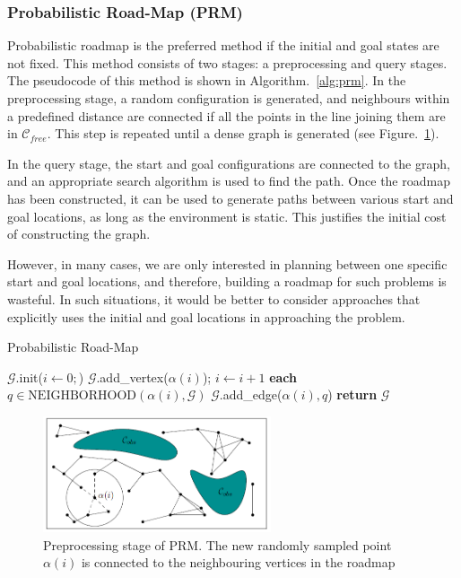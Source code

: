 \subsubsection{Probabilistic Road-Map (PRM)}
Probabilistic roadmap is the preferred method if the initial and goal states are not fixed. This method consists of two stages: a preprocessing and query stages. The pseudocode of this method is shown in Algorithm.~\ref{alg:prm}.
In the preprocessing stage, a random configuration is generated, and neighbours within a predefined distance are connected if all the points in the line joining them are in $\mathcal{C}_{free}$. This step is repeated until a dense graph is generated (see Figure.~\ref{fig:prm}). 

In the query stage, the start and goal configurations are connected to the graph, and an appropriate search algorithm is used to find the path. Once the roadmap has been constructed, it can be used to generate paths between various start and goal locations, as long as the environment is static. This justifies the initial cost of constructing the graph. 

However, in many cases, we are only interested in planning between one specific start and goal locations, and therefore, building a roadmap for such problems is wasteful. In such situations, it would be better to consider approaches that explicitly uses the initial and goal locations in approaching the problem.


\begin{algorithm}
\caption{Probabilistic Road-Map}\label{alg:prm}
\begin{algorithmic}[1]
\State $\mathcal{G}$.init($i\gets 0;$)
\State $\mathcal{G}$.add\_vertex($\alpha(i)$); $i\gets i+1$
\For \textbf{each} $q\in \text{NEIGHBORHOOD}(\alpha(i),\mathcal{G})$
\State $\mathcal{G}$.add\_edge($\alpha(i),q$)
\EndIf
\EndFor
\EndIf
\EndWhile
\State \textbf{return} $\mathcal{G}$
\end{algorithmic}
\end{algorithm}

\begin{figure}
\centering
\includegraphics[width=0.6\textwidth]{./images/prm}
\caption[Preprocessing stage of PRM]{Preprocessing stage of PRM. The new randomly sampled point $\alpha(i)$ is connected to the neighbouring vertices in the roadmap}
\label{fig:prm}
\end{figure}


